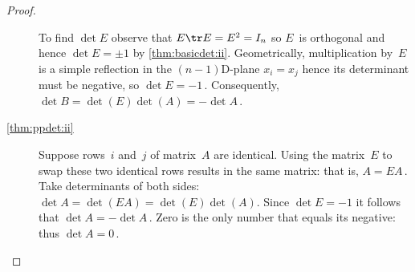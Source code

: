 \begin{proof}
\begin{description}
To find \(\det E\) observe that \(E\tr E=E^2=I_n\) so \(E\)~is orthogonal and hence \(\det E=\pm 1\) by \cref{thm:basicdet:ii}.
Geometrically, multiplication by~\(E\) is a simple reflection in the $(n-1)$D-plane \(x_i=x_j\) hence its determinant must be negative, so \(\det E=-1\)\,.
Consequently, \(\det B=\det(E)\det(A)=-\det A\)\,.

\item[\ref{thm:ppdet:ii}]
Suppose rows~\(i\) and~\(j\) of matrix~\(A\) are identical.
Using the matrix~\(E\) to swap these two identical rows results in the same matrix: that is, \(A=EA\)\,.
Take determinants of both sides: \(\det A=\det(EA)=\det(E)\det(A)\).
Since \(\det E=-1\) it follows that \(\det A=-\det A\)\,.
Zero is the only number that equals its negative: thus \(\det A=0\)\,.
\end{description}
\end{proof}





